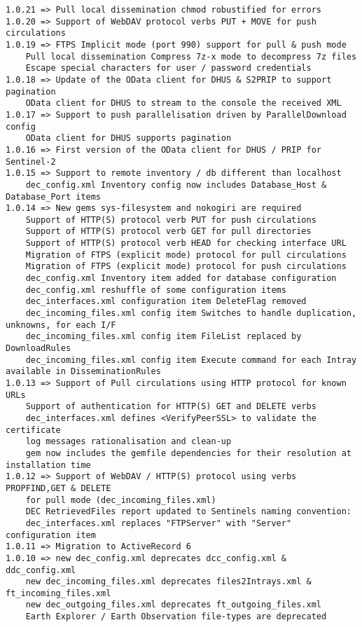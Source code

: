\documentclass[dec_sum_main.tex]{subfiles}
\begin{document}
\begin{Verbatim}[tabsize=4]
1.0.21 => Pull local dissemination chmod robustified for errors
1.0.20 => Support of WebDAV protocol verbs PUT + MOVE for push circulations
1.0.19 => FTPS Implicit mode (port 990) support for pull & push mode
    Pull local dissemination Compress 7z-x mode to decompress 7z files
    Escape special characters for user / password credentials
1.0.18 => Update of the OData client for DHUS & S2PRIP to support pagination
    OData client for DHUS to stream to the console the received XML
1.0.17 => Support to push parallelisation driven by ParallelDownload config
    OData client for DHUS supports pagination
1.0.16 => First version of the OData client for DHUS / PRIP for Sentinel-2
1.0.15 => Support to remote inventory / db different than localhost
    dec_config.xml Inventory config now includes Database_Host & Database_Port items
1.0.14 => New gems sys-filesystem and nokogiri are required
    Support of HTTP(S) protocol verb PUT for push circulations
    Support of HTTP(S) protocol verb GET for pull directories
    Support of HTTP(S) protocol verb HEAD for checking interface URL
    Migration of FTPS (explicit mode) protocol for pull circulations
    Migration of FTPS (explicit mode) protocol for push circulations
    dec_config.xml Inventory item added for database configuration
    dec_config.xml reshuffle of some configuration items
    dec_interfaces.xml configuration item DeleteFlag removed
    dec_incoming_files.xml config item Switches to handle duplication, unknowns, for each I/F
    dec_incoming_files.xml config item FileList replaced by DownloadRules
    dec_incoming_files.xml config item Execute command for each Intray available in DisseminationRules
1.0.13 => Support of Pull circulations using HTTP protocol for known URLs
    Support of authentication for HTTP(S) GET and DELETE verbs
    dec_interfaces.xml defines <VerifyPeerSSL> to validate the certificate
    log messages rationalisation and clean-up
    gem now includes the gemfile dependencies for their resolution at installation time
1.0.12 => Support of WebDAV / HTTP(S) protocol using verbs PROPFIND,GET & DELETE
    for pull mode (dec_incoming_files.xml)
    DEC RetrievedFiles report updated to Sentinels naming convention:
    dec_interfaces.xml replaces "FTPServer" with "Server" configuration item
1.0.11 => Migration to ActiveRecord 6
1.0.10 => new dec_config.xml deprecates dcc_config.xml & ddc_config.xml
    new dec_incoming_files.xml deprecates files2Intrays.xml & ft_incoming_files.xml
    new dec_outgoing_files.xml deprecates ft_outgoing_files.xml
    Earth Explorer / Earth Observation file-types are deprecated

\end{Verbatim}
\end{document}
